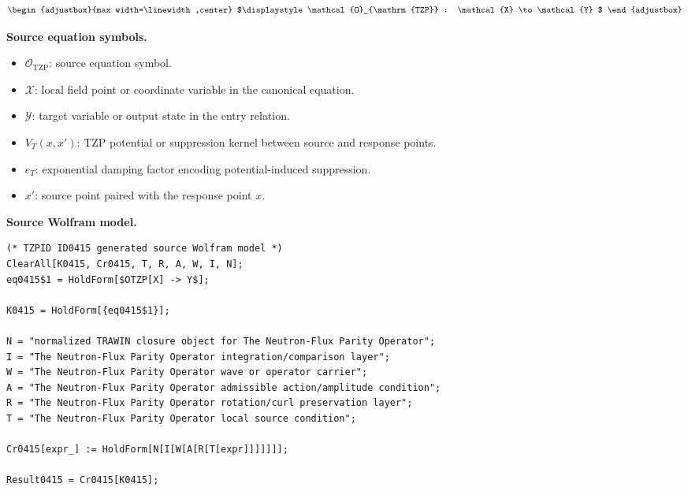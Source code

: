 \[
\begin{adjustbox}{max width=\linewidth,center}
$\displaystyle
\mathcal{O}_{\mathrm{TZP}} : \mathcal{X} \to \mathcal{Y}
$
\end{adjustbox}
\]

\begin{minipage}[t]{0.49\linewidth}
\begingroup
\small
\raggedright
\textbf{Source equation symbols.}\par
\begin{itemize}[leftmargin=1.35em,itemsep=1pt,topsep=1pt,parsep=0pt]
    \item $\mathcal{O}_{\mathrm{TZP}}$: source equation symbol.
    \item $\mathcal{X}$: local field point or coordinate variable in the canonical equation.
    \item $\mathcal{Y}$: target variable or output state in the entry relation.
    \item $V_{T}(x,x')$: TZP potential or suppression kernel between source and response points.
    \item $e_T$: exponential damping factor encoding potential-induced suppression.
    \item $x'$: source point paired with the response point $x$.
\end{itemize}
\endgroup
\end{minipage}\hfill
\begin{minipage}[t]{0.47\linewidth}
\begingroup
\scriptsize
\raggedright
\textbf{Source Wolfram model.}\par
\begin{Verbatim}[fontsize=\tiny,breaklines=true,breakanywhere=true]
(* TZPID ID0415 generated source Wolfram model *)
ClearAll[K0415, Cr0415, T, R, A, W, I, N];
eq0415$1 = HoldForm[$OTZP[X] -> Y$];

K0415 = HoldForm[{eq0415$1}];

N = "normalized TRAWIN closure object for The Neutron-Flux Parity Operator";
I = "The Neutron-Flux Parity Operator integration/comparison layer";
W = "The Neutron-Flux Parity Operator wave or operator carrier";
A = "The Neutron-Flux Parity Operator admissible action/amplitude condition";
R = "The Neutron-Flux Parity Operator rotation/curl preservation layer";
T = "The Neutron-Flux Parity Operator local source condition";

Cr0415[expr_] := HoldForm[N[I[W[A[R[T[expr]]]]]]];

Result0415 = Cr0415[K0415];
\end{Verbatim}
\endgroup
\end{minipage}

